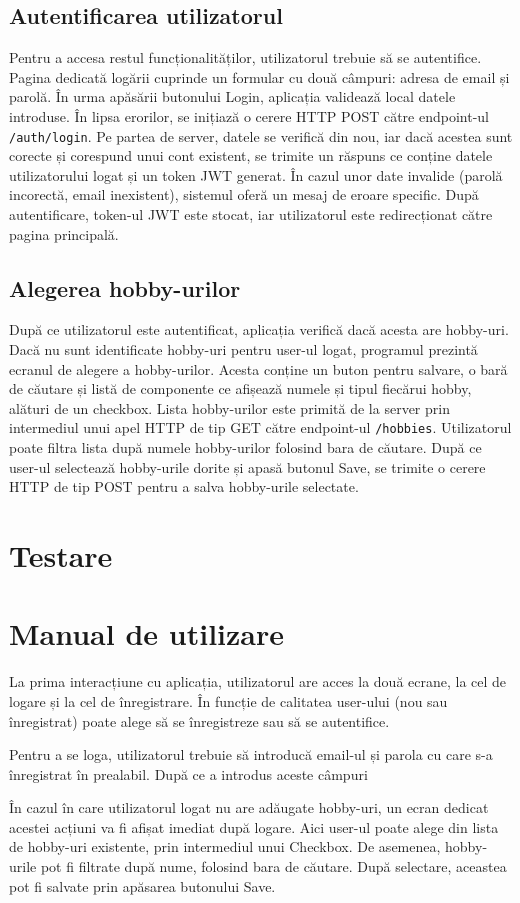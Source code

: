\subsection{Autentificarea utilizatorul}
\label{subsec:ch4sec2sub2}
Pentru a accesa restul funcționalităților, utilizatorul trebuie să se autentifice. Pagina dedicată logării cuprinde un formular cu două câmpuri: adresa de email și parolă.
În urma apăsării butonului Login, aplicația validează local datele introduse. În lipsa erorilor, se inițiază o cerere HTTP POST către endpoint-ul \texttt{/auth/login}.
Pe partea de server, datele se verifică din nou, iar dacă acestea sunt corecte și corespund unui cont existent, se trimite un răspuns ce conține datele utilizatorului logat și un token JWT generat.
În cazul unor date invalide (parolă incorectă, email inexistent), sistemul oferă un mesaj de eroare specific. După autentificare, token-ul JWT este stocat, iar utilizatorul este redirecționat către pagina principală.


\subsection{Alegerea hobby-urilor}
\label{subsec:ch4sec2sub3}
După ce utilizatorul este autentificat, aplicația verifică dacă acesta are hobby-uri. Dacă nu sunt identificate hobby-uri pentru user-ul logat, programul prezintă
ecranul de alegere a hobby-urilor. Acesta conține un buton pentru salvare, o bară de căutare și listă de componente ce afișează numele și tipul fiecărui hobby, alături de un checkbox.
Lista hobby-urilor este primită de la server prin intermediul unui apel HTTP de tip GET către endpoint-ul \texttt{/hobbies}. 
Utilizatorul poate filtra lista după numele hobby-urilor folosind bara de căutare. 
După ce user-ul selectează hobby-urile dorite și apasă butonul Save, se trimite o cerere HTTP de tip POST pentru a salva hobby-urile selectate.

\section{Testare}
\label{sec:ch4sec3}

\section{Manual de utilizare}
\label{sec:ch4sec4}

La prima interacțiune cu aplicația, utilizatorul are acces la două ecrane, la cel de logare și la cel de înregistrare. 
În funcție de calitatea user-ului (nou sau înregistrat) poate alege să se înregistreze sau să se autentifice.
\par
Pentru a se loga, utilizatorul trebuie să introducă email-ul și parola cu care s-a înregistrat în prealabil. După ce a introdus aceste câmpuri
\par
În cazul în care utilizatorul logat nu are adăugate hobby-uri, un ecran dedicat acestei acțiuni va fi afișat imediat după logare.
Aici user-ul poate alege din lista de hobby-uri existente, prin intermediul unui Checkbox. 
De asemenea, hobby-urile pot fi filtrate după nume, folosind bara de căutare.
După selectare, aceastea pot fi salvate prin apăsarea butonului Save.